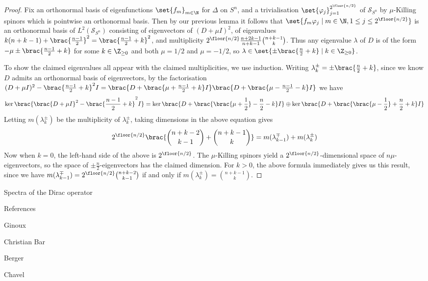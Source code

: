 \documentclass[11pt]{report}
\renewcommand{\S}{\mathcal{S}}
\begin{document}
\begin{proof}
    Fix an orthonormal basis of eigenfunctions $\set{f_m}_{m \in \N}$ for $\Delta$ on $S^n$, and a trivialisation $\set{\varphi_j}_{j = 1}^{2^{\floor{n/2}}}$ of $\S_{S^n}$ by $\mu$-Killing spinors which is pointwise an orthonormal basis. Then by our previous lemma it follows that $\set{f_m\varphi_j \mid m \in \N, 1 \leq j \leq 2^{\floor{n/2}}}$ is an orthonormal basis of $L^2(\S_{S^n})$ consisting of eigenvectors of $(D + \mu I)^2$, of eigenvalues $k(n + k - 1) + \brac{\frac{n - 1}{2}}^2 = \brac{\frac{n - 1}{2} + k}^2$, and multiplicity $2^{\floor{n/2}}\frac{n + 2k - 1}{n + k - 1}{n + k - 1 \choose k}$. Thus any eigenvalue $\lambda$ of $D$ is of the form $-\mu \pm \brac{\frac{n - 1}{2} + k}$ for some $k \in \Z_{\geq 0}$ and both $\mu = 1/2$ and $\mu = -1/2$, so $\lambda \in \set{\pm \brac{\frac n2 + k} \mid k \in \Z_{\geq 0}}$.

    To show the claimed eigenvalues all appear with the claimed multiplicities, we use induction. Writing $\lambda_k^\pm = \pm\brac{\frac n2 + k}$, since we know $D$ admits an orthonormal basis of eigenvectors, by the factorisation ${(D + \mu I)^2 - \brac{\frac{n - 1}{2} + k}^2I = \brac{D + \brac{\mu + \frac{n - 1}{2} + k}I}\brac{D + \brac{\mu - \frac{n - 1}{2} - k}I}}$ we have
    $$
        \ker\brac{\brac{D + \mu I}^2 - \brac{\frac{n - 1}{2} + k}^2I} = \ker\brac{D + \brac{\brac{\mu + \frac12} - \frac{n}{2} - k}I} \oplus \ker\brac{D + \brac{\brac{\mu - \frac12} + \frac{n}{2} + k}I}
    $$
    Letting $m(\lambda_k^\pm)$ be the multiplicity of $\lambda_k^\pm$, taking dimensions in the above equation gives 
    $$
        2^{\floor{n/2}}\brac{{n + k - 2 \choose k - 1} + {n + k - 1 \choose k}} = m(\lambda_{k - 1}^\mp) + m(\lambda_k^\pm)
    $$
    Now when $k = 0$, the left-hand side of the above is $2^{\floor{n/2}}$. The $\mu$-Killing spinors yield a $2^{\floor{n/2}}$-dimensional space of $n\mu$-eigenvectors, so the space of $\pm \frac n2$-eigenvectors has the claimed dimension. For $k > 0$, the above formula immediately gives us this result, since we have $m(\lambda_{k - 1}^\mp) = 2^{\floor{n/2}}{n + k - 2 \choose k - 1}$ if and only if $m(\lambda_k^\pm) = {n + k - 1 \choose k}$.
\end{proof}

Spectra of the Dirac operator

References

Ginoux

Christian Bar

Berger

Chavel

\end{document}
